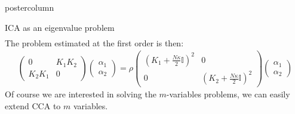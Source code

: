 \documentclass{beamer}
\begin{document}
\begin{frame}
\begin{columns}
\begin{column}{.5\textwidth}
\begin{beamercolorbox}[center]{postercolumn}
\begin{minipage}{.98\textwidth}
{\begin{myblock}{ICA as an eigenvalue problem}
\begin{align*}
						\end{align*}
						The problem estimated at the first order is then:
						\begin{align*}
							\begin{pmatrix}
								0 & K_1 K_2 \\
								K_2 K_1 & 0
							\end{pmatrix} \begin{pmatrix}
								\alpha_1 \\ \alpha_2
							\end{pmatrix}
							= \rho \begin{pmatrix}
								(K_1+\frac{N \kappa}{2} \mathbb{I})^2 & 0 \\
								0 & (K_2+\frac{N \kappa}{2} \mathbb{I})^2
							\end{pmatrix} \begin{pmatrix}
								\alpha_1 \\ \alpha_2
							\end{pmatrix}
						\end{align*}
						Of course we are interested in solving the $m$-variables problems, we can easily extend CCA to $m$ variables.

\end{myblock}}
\end{minipage}
\end{beamercolorbox}
\end{column}
\end{columns}
\end{frame}
\end{document}
